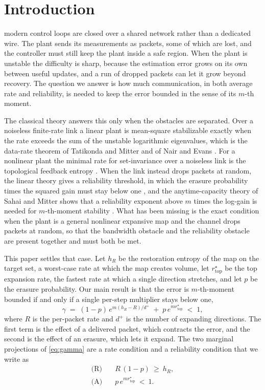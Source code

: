 \documentclass[journal]{IEEEtran}
\theoremstyle{definition}
\theoremstyle{remark}
\newcommand{\rtop}{r^\star_{\mathrm{top}}}
\newcommand{\hR}{h_R}
\newcommand{\dplus}{d^{+}}
\begin{document}
\section{Introduction}
 modern control loops are closed over a shared network rather than a dedicated wire. The
plant sends its measurements as packets, some of which are lost, and the controller must still keep the plant
inside a safe region. When the plant is unstable the difficulty is sharp, because the estimation error grows on
its own between useful updates, and a run of dropped packets can let it grow beyond recovery. The question we
answer is how much communication, in both average rate and reliability, is needed to keep the error bounded in
the sense of its $m$-th moment.

The classical theory answers this only when the obstacles are separated. Over a noiseless finite-rate link a
linear plant is mean-square stabilizable exactly when the rate exceeds the sum of the unstable logarithmic
eigenvalues, which is the data-rate theorem of Tatikonda and Mitter and of Nair and Evans
\cite{tatikondamitter2004,nairevans2004}. For a nonlinear plant the minimal rate for set-invariance over a
noiseless link is the topological feedback entropy \cite{nemm2004}. When the link instead drops packets at
random, the linear theory gives a reliability threshold, in which the erasure probability times the squared gain
must stay below one \cite{sinopoli2004,elia2005}, and the anytime-capacity theory of Sahai and Mitter shows that
a reliability exponent above $m$ times the log-gain is needed for $m$-th-moment stability \cite{sahaimitter2006}.
What has been missing is the exact condition when the plant is a general nonlinear expansive map and the channel
drops packets at random, so that the bandwidth obstacle and the reliability obstacle are present together and
must both be met.

This paper settles that case. Let $\hR$ be the restoration entropy of the map on the target set, a worst-case
rate at which the map creates volume, let $\rtop$ be the top expansion rate, the fastest rate at which a single
direction stretches, and let $p$ be the erasure probability. Our main result is that the error is $m$-th-moment
bounded if and only if a single per-step multiplier stays below one,
\begin{equation}
\gamma \;=\; (1-p)\,e^{m(\hR-R)/\dplus} \;+\; p\,e^{m\rtop} \;<\; 1, \label{eq:gamma}
\end{equation}
where $R$ is the per-packet rate and $\dplus$ is the number of expanding directions. The first term is the effect
of a delivered packet, which contracts the error, and the second is the effect of an erasure, which lets it
expand. The two marginal projections of \eqref{eq:gamma} are a rate condition and a reliability condition that we
write as
\begin{align}
\text{(R)}\quad & R\,(1-p)\ \ge\ \hR, \label{eq:R}\\
\text{(A)}\quad & p\,e^{m\rtop}\ <\ 1. \label{eq:A}
\end{align}
\end{document}
